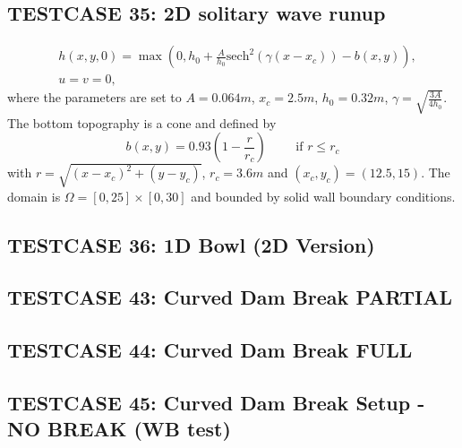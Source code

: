 \documentclass[times,sort]{elsarticle}
\theoremstyle{plain}
\theoremstyle{proofpartstyle} \newtheorem*{proofpart}{Proof of Part}
\theoremstyle{plain}
\theoremstyle{remark}
\numberwithin{equation}{section}
\begin{document}
\subsection{TESTCASE 35: 2D solitary wave runup}
\begin{equation}
\begin{aligned}
&h(x,y,0)=\max \left( 0, h_0 + \frac{A}{h_0}  \text{sech}^2 (\gamma (x-x_c)) -b(x,y) \right),\\
&u=v=0,
\end{aligned}
\end{equation}
where the parameters are set to $A=0.064m$, $x_c = 2.5m$, $h_0 = 0.32m$, $\gamma = \sqrt{\frac{3A}{4h_0}}$. The bottom topography is a cone and defined by
\begin{equation}
b(x,y) = 0.93 \left(1-\frac{r}{r_c}\right)	\qquad \text{ if } r\leq r_c
\end{equation}
with $r=\sqrt{(x-x_c)^2 + (y-y_c)}$,  $r_c = 3.6m$ and $(x_c,y_c) = (12.5,15)$. The domain is $\Omega = [0,25] \times [0,30]$ and bounded by solid wall boundary conditions.
\subsection{TESTCASE 36: 1D Bowl (2D Version)}
\subsection{TESTCASE 43: Curved Dam Break PARTIAL}
\subsection{TESTCASE 44: Curved Dam Break FULL}
\subsection{TESTCASE 45: Curved Dam Break Setup - NO BREAK (WB test)}
\end{document}
